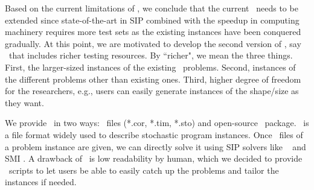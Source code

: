 Based on the current limitations of \siplib, we conclude that the current \siplib\ needs to be extended since state-of-the-art in SIP combined with the speedup in computing machinery requires more test sets as the existing instances have been conquered gradually. At this point, we are motivated to develop the second version of \siplib, say \siplibtwo\ that includes richer testing resources. By ``richer", we mean the three things. First, the larger-sized instances of the existing \siplib\ problems. Second, instances of the different problems other than existing ones. Third, higher degree of freedom for the researchers, e.g., users can easily generate instances of the shape/size as they want.

We provide \siplibtwo\ in two ways: \smps\ files (*.cor, *.tim, *.sto) and open-source \julia\ package. \smps\ is a file format widely used to describe stochastic program instances. Once \smps\ files of a problem instance are given, we can directly solve it using SIP solvers like \dsp\ \cite{journal:KZ2015} and \textsf{SMI} \cite{web:SMI}. A drawback of \smps\ is low readability by human, which we decided to provide \julia\ scripts to let users be able to easily catch up the problems and tailor the instances if needed.

